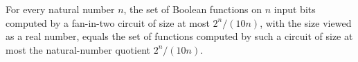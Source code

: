 \begin{theorem}
\label{BoolCircuit.computableDAG_real_cutoff}
\leanok
{}
For every natural number $n$, the set of Boolean functions on $n$ input bits computed by
a fan-in-two circuit of size at most $2^n/(10n)$, with the size viewed as a real number,
equals the set of functions computed by such a circuit of size at most the
natural-number quotient $2^n/(10n)$.
\end{theorem}
